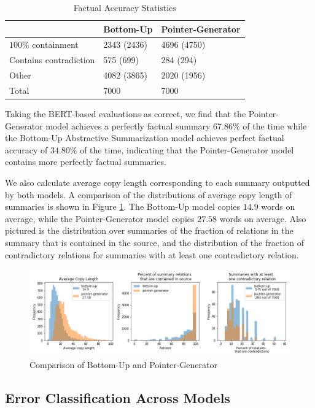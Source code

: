 \documentclass{article}
\begin{document}
\begin{table}[H]
  \centering
  \begin{tabular}{m{10em}||m{5em}|m{5em}}
  & Bottom-Up & Pointer-Generator \\
  \hline
$100\%$ containment & 2343 (2436) & 4696 (4750)  \\
\hline
Contains contradiction & 575 (699) & 284 (294) \\
\hline
Other & 4082 (3865) & 2020 (1956) \\
\hline
Total & 7000 & 7000
\end{tabular}
 \caption{Factual Accuracy Statistics}
  \label{fig:summary}
\end{table}

Taking the BERT-based evaluations as correct, we find that the Pointer-Generator model achieves a perfectly factual summary $67.86\%$ of the time while the Bottom-Up Abstractive Summarization model achieves perfect factual accuracy of $34.80\%$ of the time, indicating that the Pointer-Generator model contains more perfectly factual summaries.

We also calculate average copy length corresponding to each summary outputted by both models. A comparison of the distributions of average copy length of summaries is shown in Figure \ref{fig:all_hists}. The Bottom-Up model copies $14.9$ words on average, while the Pointer-Generator model copies $27.58$ words on average. Also pictured is the distribution over summaries of the fraction of relations in the summary that is contained in the source, and the distribution of the fraction of contradictory relations for summaries with at least one contradictory relation.

\begin{figure}
  \centering
  \includegraphics[width=\linewidth]{figs/all_hists.png}
  \caption{Comparison of Bottom-Up and Pointer-Generator}
  \label{fig:all_hists}
\end{figure}

\subsection{Error Classification Across Models}
\end{document}
